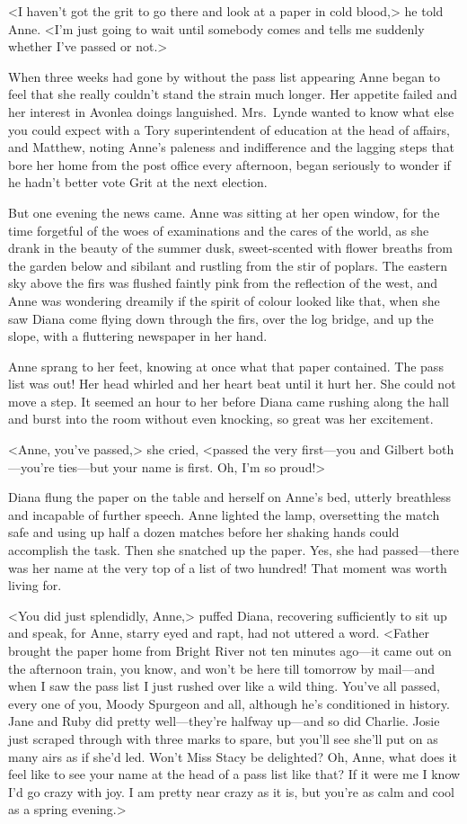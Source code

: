 <I haven't got the grit to go there and look at a paper in cold blood,> he told Anne. <I'm just going to wait until somebody comes and tells me suddenly whether I've passed or not.>

When three weeks had gone by without the pass list appearing Anne began to feel that she really couldn't stand the strain much longer. Her appetite failed and her interest in Avonlea doings languished. Mrs.~Lynde wanted to know what else you could expect with a Tory superintendent of education at the head of affairs, and Matthew, noting Anne's paleness and indifference and the lagging steps that bore her home from the post office every afternoon, began seriously to wonder if he hadn't better vote Grit at the next election.

But one evening the news came. Anne was sitting at her open window, for the time forgetful of the woes of examinations and the cares of the world, as she drank in the beauty of the summer dusk, sweet-scented with flower breaths from the garden below and sibilant and rustling from the stir of poplars. The eastern sky above the firs was flushed faintly pink from the reflection of the west, and Anne was wondering dreamily if the spirit of colour looked like that, when she saw Diana come flying down through the firs, over the log bridge, and up the slope, with a fluttering newspaper in her hand.

Anne sprang to her feet, knowing at once what that paper contained. The pass list was out! Her head whirled and her heart beat until it hurt her. She could not move a step. It seemed an hour to her before Diana came rushing along the hall and burst into the room without even knocking, so great was her excitement.

<Anne, you've passed,> she cried, <passed the very first—you and Gilbert both—you're ties—but your name is first. Oh, I'm so proud!>

Diana flung the paper on the table and herself on Anne's bed, utterly breathless and incapable of further speech. Anne lighted the lamp, oversetting the match safe and using up half a dozen matches before her shaking hands could accomplish the task. Then she snatched up the paper. Yes, she had passed—there was her name at the very top of a list of two hundred! That moment was worth living for.

<You did just splendidly, Anne,> puffed Diana, recovering sufficiently to sit up and speak, for Anne, starry eyed and rapt, had not uttered a word. <Father brought the paper home from Bright River not ten minutes ago—it came out on the afternoon train, you know, and won't be here till tomorrow by mail—and when I saw the pass list I just rushed over like a wild thing. You've all passed, every one of you, Moody Spurgeon and all, although he's conditioned in history. Jane and Ruby did pretty well—they're halfway up—and so did Charlie. Josie just scraped through with three marks to spare, but you'll see she'll put on as many airs as if she'd led. Won't Miss Stacy be delighted? Oh, Anne, what does it feel like to see your name at the head of a pass list like that? If it were me I know I'd go crazy with joy. I am pretty near crazy as it is, but you're as calm and cool as a spring evening.>

